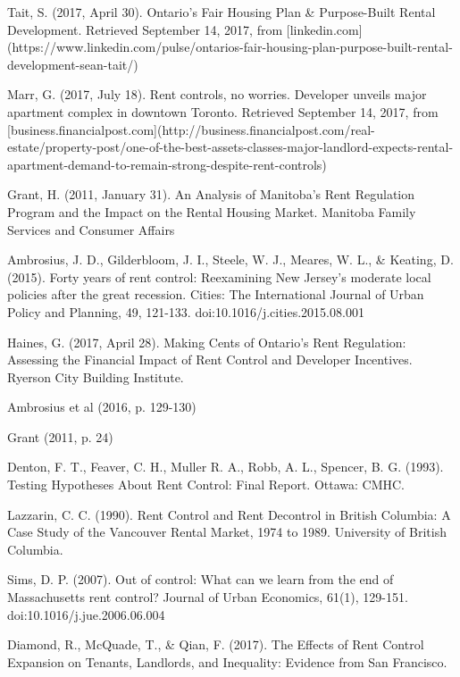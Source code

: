 \begin{thebibliography}{9}
  Tait, S. (2017, April 30). Ontario’s Fair Housing Plan \& Purpose-Built Rental Development. Retrieved September 14, 2017, from [linkedin.com](https://www.linkedin.com/pulse/ontarios-fair-housing-plan-purpose-built-rental-development-sean-tait/)

  Marr, G. (2017, July 18). Rent controls, no worries. Developer unveils major apartment complex in downtown Toronto. Retrieved September 14, 2017, from [business.financialpost.com](http://business.financialpost.com/real-estate/property-post/one-of-the-best-assets-classes-major-landlord-expects-rental-apartment-demand-to-remain-strong-despite-rent-controls)

  Grant, H. (2011, January 31). An Analysis of Manitoba’s Rent Regulation Program and the Impact on the Rental Housing Market. Manitoba Family Services and Consumer Affairs

   Ambrosius, J. D., Gilderbloom, J. I., Steele, W. J., Meares, W. L., \& Keating, D. (2015). Forty years of rent control: Reexamining New Jersey’s moderate local policies after the great recession. Cities: The International Journal of Urban Policy and Planning, 49, 121-133. doi:10.1016/j.cities.2015.08.001

  Haines, G. (2017, April 28). Making Cents of Ontario’s Rent Regulation: Assessing the Financial Impact of Rent Control and Developer Incentives. Ryerson City Building Institute.

  Ambrosius et al (2016, p. 129-130)

  Grant (2011, p. 24)

  Denton, F. T., Feaver, C. H., Muller R. A., Robb, A. L., Spencer, B. G. (1993). Testing Hypotheses About Rent Control: Final Report. Ottawa: CMHC.

  Lazzarin, C. C. (1990). Rent Control and Rent Decontrol in British Columbia: A Case Study of the Vancouver Rental Market, 1974 to 1989. University of British Columbia.

  Sims, D. P. (2007). Out of control: What can we learn from the end of Massachusetts rent control? Journal of Urban Economics, 61(1), 129-151. doi:10.1016/j.jue.2006.06.004

   Diamond, R., McQuade, T., \& Qian, F. (2017). The Effects of Rent Control Expansion on Tenants, Landlords, and Inequality: Evidence from San Francisco.


\end{thebibliography}
